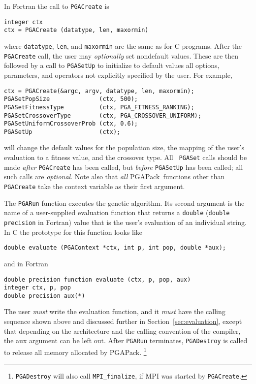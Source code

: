 \documentclass{report}
\newcommand{\pga}{PGAPack}
\begin{document}
In Fortran the call to {\tt PGACreate} is
\begin{verbatim}
integer ctx
ctx = PGACreate (datatype, len, maxormin)
\end{verbatim}
where  {\tt datatype}, {\tt len}, and {\tt maxormin} are the same as for C
programs.
After the {\tt PGACreate} call, the user may {\em optionally} set nondefault
values.  These are then followed by a call to {\tt PGASetUp} to initialize to
default values all options, parameters, and operators not explicitly specified
by the user. For example,
\begin{verbatim}
ctx = PGACreate(&argc, argv, datatype, len, maxormin);
PGASetPopSize              (ctx, 500);
PGASetFitnessType          (ctx, PGA_FITNESS_RANKING);
PGASetCrossoverType        (ctx, PGA_CROSSOVER_UNIFORM);
PGASetUniformCrossoverProb (ctx, 0.6);
PGASetUp                   (ctx);
\end{verbatim}
will change the default values for the population size, the mapping
of the user's
evaluation to a fitness value, and the crossover type.  All {\tt
PGASet} calls should be made {\em after} {\tt PGACreate} has been called, but
{\em before} {\tt PGASetUp} has been called; all such calls are {\em
optional}.  Note also that {\em all} \pga\ functions other than {\tt
PGACreate} take the context variable as their first argument.

The {\tt PGARun} function executes the genetic algorithm.  Its second argument
is the name of a user-supplied evaluation function that returns a {\tt double}
({\tt double precision} in Fortran) value that is the user's evaluation of an
individual string.  In C the prototype for this function looks like
\begin{verbatim}
double evaluate (PGAContext *ctx, int p, int pop, double *aux);
\end{verbatim}
and in Fortran
\begin{verbatim}
double precision function evaluate (ctx, p, pop, aux)
integer ctx, p, pop
double precision aux(*)
\end{verbatim}
The user {\em must} write the evaluation function, and it {\em must} have the
calling sequence shown above and discussed further in
Section~\ref{sec:evaluation}, except that depending on the architecture
and the calling convention of the compiler, the aux argument can be left
out.  After {\tt PGARun} terminates, {\tt PGADestroy}
is called to release all memory allocated by \pga.
\footnote{{\tt PGADestroy} will also call {\tt MPI\_finalize}, if MPI was
started by {\tt PGACreate}.}
\end{document}
